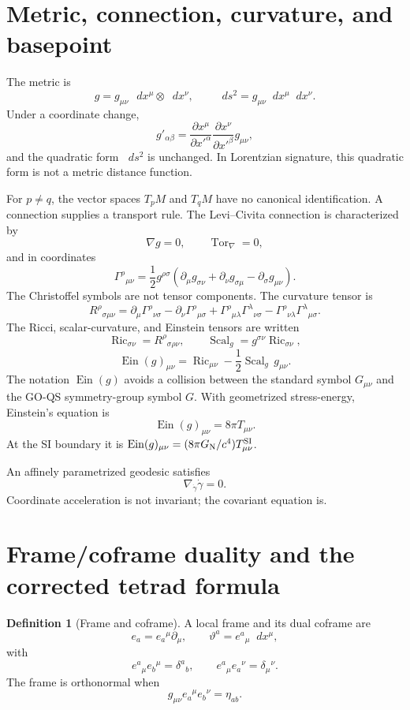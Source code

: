 \documentclass[11pt,a4paper]{article}
\theoremstyle{definition}
\newtheorem{definition}{Definition}[section]
\theoremstyle{plain}
\theoremstyle{remark}
\newcommand{\dd}{\mathop{}\!d}
\begin{document}
\section{Metric, connection, curvature, and basepoint}

The metric is
\[
g=g_{\mu\nu}\,\dd x^\mu\otimes\dd x^\nu,
\qquad
\dd s^2=g_{\mu\nu}\dd x^\mu\dd x^\nu.
\]
Under a coordinate change,
\[
g'_{\alpha\beta}
=\frac{\partial x^\mu}{\partial x'^\alpha}
\frac{\partial x^\nu}{\partial x'^\beta}g_{\mu\nu},
\]
and the quadratic form $\dd s^2$ is unchanged. In Lorentzian signature,
this quadratic form is not a metric distance function.

For $p\ne q$, the vector spaces $T_pM$ and $T_qM$ have no canonical
identification. A connection supplies a transport rule. The Levi--Civita
connection is characterized by
\[
\nabla g=0,\qquad
\operatorname{Tor}_\nabla=0,
\]
and in coordinates
\[
\Gamma^\rho{}_{\mu\nu}
=\frac12 g^{\rho\sigma}
\left(
\partial_\mu g_{\sigma\nu}
+\partial_\nu g_{\sigma\mu}
-\partial_\sigma g_{\mu\nu}
\right).
\]
The Christoffel symbols are not tensor components. The curvature tensor is
\[
R^\rho{}_{\sigma\mu\nu}
=\partial_\mu\Gamma^\rho{}_{\nu\sigma}
-\partial_\nu\Gamma^\rho{}_{\mu\sigma}
+\Gamma^\rho{}_{\mu\lambda}\Gamma^\lambda{}_{\nu\sigma}
-\Gamma^\rho{}_{\nu\lambda}\Gamma^\lambda{}_{\mu\sigma}.
\]
The Ricci, scalar-curvature, and Einstein tensors are written
\[
\operatorname{Ric}_{\sigma\nu}
=R^\rho{}_{\sigma\rho\nu},
\qquad
\operatorname{Scal}_g
=g^{\sigma\nu}\operatorname{Ric}_{\sigma\nu},
\]
\[
\operatorname{Ein}(g)_{\mu\nu}
=\operatorname{Ric}_{\mu\nu}
-\frac12\operatorname{Scal}_g\,g_{\mu\nu}.
\]
The notation $\operatorname{Ein}(g)$ avoids a collision between the
standard symbol $G_{\mu\nu}$ and the GO-QS symmetry-group symbol $G$.
With geometrized stress-energy, Einstein's equation is
\[
\operatorname{Ein}(g)_{\mu\nu}=8\pi T_{\mu\nu}.
\]
At the SI boundary it is
$\operatorname{Ein}(g)_{\mu\nu}
=(8\pi G_{\rm N}/c^4)T^{\rm SI}_{\mu\nu}$.

An affinely parametrized geodesic satisfies
\[
\nabla_{\dot\gamma}\dot\gamma=0.
\]
Coordinate acceleration is not invariant; the covariant equation is.

\section{Frame/coframe duality and the corrected tetrad formula}

\begin{definition}[Frame and coframe]
A local frame and its dual coframe are
\[
e_a=e_a{}^\mu\partial_\mu,
\qquad
\vartheta^a=e^a{}_\mu\dd x^\mu,
\]
with
\[
e^a{}_\mu e_b{}^\mu=\delta^a{}_b,
\qquad
e^a{}_\mu e_a{}^\nu=\delta_\mu{}^\nu.
\]
The frame is orthonormal when
\[
g_{\mu\nu}e_a{}^\mu e_b{}^\nu=\eta_{ab}.
\]
\end{definition}
\end{document}

